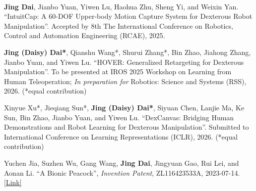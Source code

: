 
\vspace{-17mm}

\begin{cventries}
    \cventry
    {} %
    {\ } %
    {\ } %
    {} %
    {
        \begin{cvitemize2}
            \item \textbf{Jing Dai}, Jianbo Yuan, Yiwen Lu, Haohua Zhu, Sheng Yi, and Weixin Yan. ``IntuitCap: A 60-DOF Upper-body Motion Capture System for Dexterous Robot Manipulation''. Accepted by 8th The International Conference on Robotics, Control and Automation Engineering (RCAE), 2025.
            \item \textbf{Jing (Daisy) Dai*}, Qianshu Wang*, Shurui Zhang*, Bin Zhao, Jiahong Zhang, Jianbo Yuan, and Yiwen Lu. ``HOVER: Generalized Retargeting for Dexterous Manipulation''. To be presented at IROS 2025 Workshop on Learning from Human Teleoperation; \textit{In preparation for} Robotics: Science and Systems (RSS), 2026. (*equal contribution)
            \item Xinyue Xu*, Jieqiang Sun*, \textbf{Jing (Daisy) Dai*}, Siyuan Chen, Lanjie Ma, Ke Sun, Bin Zhao, Jianbo Yuan, and Yiwen Lu. ``DexCanvas: Bridging Human Demonstrations and Robot Learning for Dexterous Manipulation''. Submitted to International Conference on Learning Representations (ICLR), 2026. (*equal contribution)
            \item Yuchen Jia, Suzhen Wu, Gang Wang, \textbf{Jing Dai}, Jingyuan Gao, Rui Lei, and Aonan Li. ``A Bionic Peacock'', \textit{Invention Patent}, ZL116423533A, 2023-07-14. \href{https://pss-system.cponline.cnipa.gov.cn/documents/detail?prevPageTit=changgui}{\textcolor{link}{[Link]}}
            \vspace{-4mm}
        \end{cvitemize2}
    }
\end{cventries}
